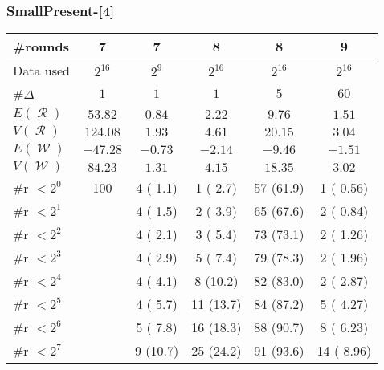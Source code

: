 \documentclass[11pt]{beamer}
\DeclareMathOperator{\R}{\mathcal{R}}
\DeclareMathOperator{\W}{\mathcal{W}}
\begin{document}
\begin{frame}
\frametitle{SmallPresent-[4]} 

\begin{small}
\begin{center}
\begin{tabular}{|l||c|c|c|c|c|}   
\hline
\#rounds &7 & 7 & 8 & 8 & 9 \\
\hline
Data used     & $2^{16}$ & $2^{9}$   & $2^{16}$  & $2^{16}$  & $2^{16}$  \\ \hline
\#$\Delta$    & $1$      & $1$       & $1$       & $5$       & $60$      \\ \hline
$E(\R)$       & $53.82$  & $0.84$    & $2.22$    & $9.76$    & $1.51$    \\ 
$V(\R)$       & $124.08$ & $1.93$    & $4.61$    & $20.15$   & $3.04$    \\ 
$E(\W)$       & $-47.28$ & $-0.73$   & $-2.14$   & $-9.46$   & $-1.51$   \\ 
$V(\W)$       & $84.23$  & $1.31$    & $4.15$    & $18.35$   & $3.02$    \\ \hline
\#r $< 2^{0}$ &      100 &  4 ( 1.1) &  1 ( 2.7) & 57 (61.9) &  1 ( 0.56)\\ 
\#r $< 2^{1}$ &          &  4 ( 1.5) &  2 ( 3.9) & 65 (67.6) &  2 ( 0.84)\\ 
\#r $< 2^{2}$ &          &  4 ( 2.1) &  3 ( 5.4) & 73 (73.1) &  2 ( 1.26)\\ 
\#r $< 2^{3}$ &          &  4 ( 2.9) &  5 ( 7.4) & 79 (78.3) &  2 ( 1.96)\\ 
\#r $< 2^{4}$ &          &  4 ( 4.1) &  8 (10.2) & 82 (83.0) &  2 ( 2.87)\\ 
\#r $< 2^{5}$ &          &  4 ( 5.7) & 11 (13.7) & 84 (87.2) &  5 ( 4.27)\\ 
\#r $< 2^{6}$ &          &  5 ( 7.8) & 16 (18.3) & 88 (90.7) &  8 ( 6.23)\\ 
\#r $< 2^{7}$ &          &  9 (10.7) & 25 (24.2) & 91 (93.6) & 14 ( 8.96)\\ \hline
\end{tabular}         
\end{center}
\end{small}
\end{frame}
\end{document}

